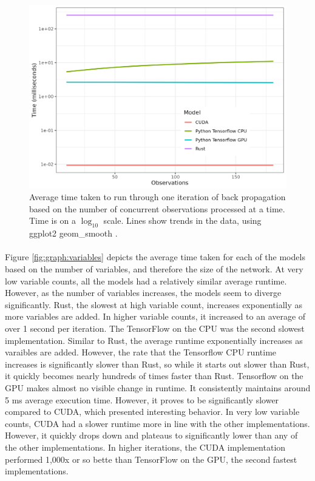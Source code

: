 \documentclass[12pt]{article}
\begin{document}
\begin{figure}
	\begin{center}
		\includegraphics[width=0.9\linewidth]{bootstraps.png}
	\end{center}
	\caption{Average time taken to run through one iteration of back propagation based on the number of concurrent observations processed at a time. Time is on a $\log_{10}$ scale. Lines show trends in the data, using ggplot2 geom\_smooth \cite{lib_ggplot2}.}
	\label{fig:graph:observations}
\end{figure}

\paragraph{}
Figure \ref{fig:graph:variables} depicts the average time taken for each of the models based on the number of variables, and therefore the size of the network.
At very low variable counts, all the models had a relatively similar average runtime.
However, as the number of variables increases, the models seem to diverge significantly.
Rust, the slowest at high variable count, increases exponentially as more variables are added.
In higher variable counts, it increased to an average of over 1 second per iteration.
The TensorFlow on the CPU was the second slowest implementation.
Similar to Rust, the average runtime exponentially increases as varaibles are added.
However, the rate that the Tensorflow CPU runtime increases is significantly slower than Rust, so while it starts out slower than Rust, it quickly becomes nearly hundreds of times faster than Rust.
Tensorflow on the GPU makes almost no visible change in runtime.
It consistently maintains around 5 ms average execution time.
However, it proves to be significantly slower compared to CUDA, which presented interesting behavior.
In very low variable counts, CUDA had a slower runtime more in line with the other implementations.
However, it quickly drops down and plateaus to significantly lower than any of the other implementations.
In higher iterations, the CUDA implementation performed 1,000x or so bette than TensorFlow on the GPU, the second fastest implementations.
\end{document}

